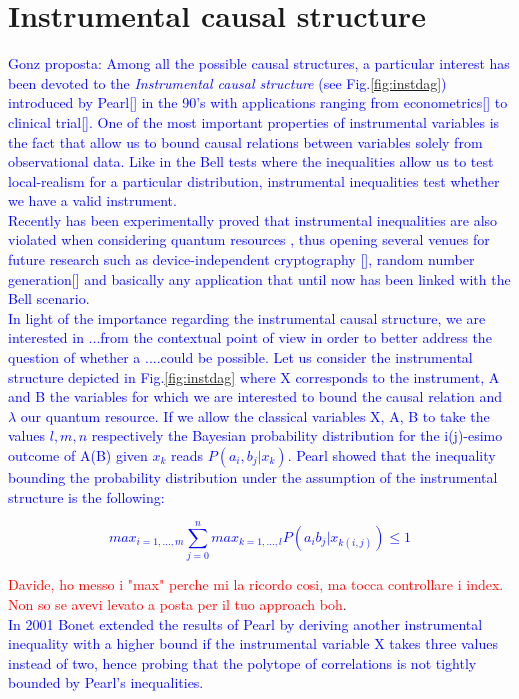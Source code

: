\documentclass[
    nofootinbin,
    floatfix,
    amsfonts,
    twocolumn, 
    aps, 
    prl]{revtex4-1}
\begin{document}
\section*{Instrumental causal structure}


\textcolor{blue}{Gonz proposta: Among all the possible causal structures, a particular interest has been devoted to the \textit{Instrumental causal structure} (see Fig.\ref{fig:instdag}) introduced by Pearl[] in the 90's with applications ranging from econometrics[] to clinical trial[]. One of the most important properties of instrumental variables is the fact that allow us to bound causal relations between variables solely from observational data. Like in the Bell tests where the inequalities allow us to test local-realism for a particular distribution, instrumental inequalities test whether we have a valid instrument.}\\
\textcolor{blue}{Recently has been experimentally proved that instrumental inequalities are also violated when considering quantum resources \cite{chaves2018}, thus opening several venues for future research such as device-independent cryptography [], random number generation[] and basically any application that until now has been linked with the Bell scenario.}\\

\textcolor{blue}{In light of the importance regarding the instrumental causal structure, we are interested in ...from the contextual point of view in order to better address the question of whether a ....could be possible.
Let us consider the instrumental structure depicted in Fig.\ref{fig:instdag} where X corresponds to the instrument, A and B the variables for which we are interested to bound the causal relation and $\lambda$ our quantum resource. If we allow the classical variables X, A, B to take the values $l,m,n$ respectively the Bayesian probability distribution for the i(j)-esimo outcome of A(B) given $x_k$ reads $P(a_i,b_j|x_k)$. Pearl showed that the inequality bounding the probability distribution under the assumption of the instrumental structure is the following: }

\textcolor{blue}{\begin{equation} 
   max_{i=1,...,m} \sum_{j=0}^{n} max_{k=1,...,l} P(a_i b_j|x_{k(i,j)}) \le 1
    \label{eq:pearl_ineq}
\end{equation}}

\textcolor{red}{Davide, ho messo i "max" perche mi la ricordo cosi, ma tocca controllare i index. Non so se avevi levato a posta per il tuo approach boh}.\\ \textcolor{blue}{In 2001 Bonet extended the results of Pearl by deriving another instrumental inequality with a higher bound if the instrumental variable X takes three values instead of two, hence probing that the polytope of correlations is not tightly bounded by Pearl's inequalities.  }
\end{document}

